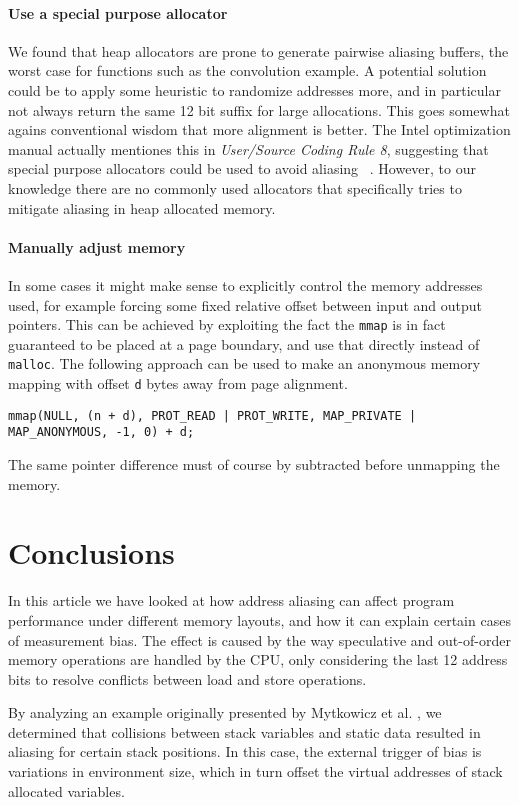 \documentclass[prodmode,acmtaco]{acmsmall}
\begin{document}
{\paragraph{Use a special purpose allocator}
We found that heap allocators are prone to generate pairwise aliasing buffers, the worst case for functions such as the convolution example.
A potential solution could be to apply some heuristic to randomize addresses more, and in particular not always return the same 12 bit suffix for large allocations.
This goes somewhat agains conventional wisdom that more alignment is better.
The Intel optimization manual actually mentiones this in \emph{User/Source Coding Rule 8}, suggesting that special purpose allocators could be used to avoid aliasing ~\cite{OptimizationManual}.
However, to our knowledge there are no commonly used allocators that specifically tries to mitigate aliasing in heap allocated memory.

\paragraph{Manually adjust memory}
In some cases it might make sense to explicitly control the memory addresses used, for example forcing some fixed relative offset between input and output pointers.
This can be achieved by exploiting the fact the \texttt{mmap} is in fact guaranteed to be placed at a page boundary, and use that directly instead of \texttt{malloc}.
The following approach can be used to make an anonymous memory mapping with offset \texttt{d} bytes away from page alignment.
\begin{lstlisting}[breaklines=true]
    mmap(NULL, (n + d), PROT_READ | PROT_WRITE, MAP_PRIVATE | MAP_ANONYMOUS, -1, 0) + d;
\end{lstlisting}
The same pointer difference must of course by subtracted before unmapping the memory.


\section{Conclusions}
In this article we have looked at how address aliasing can affect program performance under different memory layouts, and how it can explain certain cases of measurement bias. 
The effect is caused by the way speculative and out-of-order memory operations are handled by the CPU, only considering the last 12 address bits to resolve conflicts between load and store operations.

By analyzing an example originally presented by Mytkowicz et al. \cite{Mytkowicz:2009:WrongData}, we determined that collisions between stack variables and static data resulted in aliasing for certain stack positions.
In this case, the external trigger of bias is variations in environment size, which in turn offset the virtual addresses of stack allocated variables.

}
\end{document}
